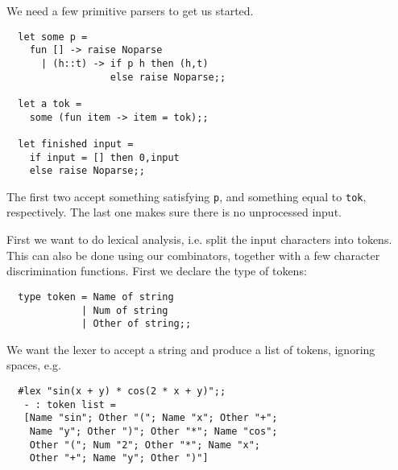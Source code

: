 \begin{slide*}


\vspace*{0.5cm}

We need a few primitive parsers to get us started.

\begin{black}\begin{verbatim}
  let some p =
    fun [] -> raise Noparse
      | (h::t) -> if p h then (h,t)
                  else raise Noparse;;

  let a tok =
    some (fun item -> item = tok);;

  let finished input =
    if input = [] then 0,input
    else raise Noparse;;
\end{verbatim}\end{black}

The first two accept something satisfying {\black \verb!p!}, and something
equal to {\black \verb!tok!}, respectively. The last one makes sure there is no
unprocessed input.

\end{slide*}


\begin{slide*}


\vspace*{0.5cm}

First we want to do lexical analysis, i.e. split the input characters into
tokens. This can also be done using our combinators, together with a few
character discrimination functions. First we declare the type of tokens:

\begin{black}\begin{verbatim}
  type token = Name of string
             | Num of string
             | Other of string;;
\end{verbatim}\end{black}

We want the lexer to accept a string and produce a list of tokens, ignoring
spaces, e.g.
\begin{black}\begin{footnotesize}\begin{verbatim}
  #lex "sin(x + y) * cos(2 * x + y)";;
   - : token list =
   [Name "sin"; Other "("; Name "x"; Other "+";
    Name "y"; Other ")"; Other "*"; Name "cos";
    Other "("; Num "2"; Other "*"; Name "x";
    Other "+"; Name "y"; Other ")"]
\end{verbatim}\end{footnotesize}\end{black}

\end{slide*}


